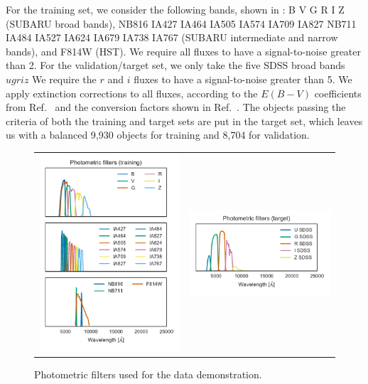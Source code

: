 \documentclass[aps,prd,showpacs,superscriptaddress,groupedaddress]{revtex4}  %
\begin{document}
For the training set, we consider the following bands, shown in : B V G R I Z (SUBARU broad bands), NB816 IA427 IA464 IA505 IA574 IA709 IA827 NB711 IA484 IA527 IA624 IA679 IA738 IA767  (SUBARU intermediate and narrow bands), and F814W (HST). 
We require all fluxes to have a signal-to-noise greater than 2. 
For the validation/target set, we only take the five SDSS broad bands $ugriz$
We require the $r$ and $i$ fluxes to have a signal-to-noise greater than 5.
We apply extinction corrections to all fluxes, according to the $E(B-V)$ coefficients from Ref.~\citep{Schlegel:1998} and the conversion factors shown in Ref.~\citep{Andrews:2016}.
The objects passing the criteria of both the training and target sets are put in the target set, which leaves us with a balanced 9,930 objects for training and 8,704 for validation.

\begin{figure}
\centering\begin{tabular}{cc}
\begin{minipage}{8cm}\includegraphics[width=8cm]{filters_training.pdf}\end{minipage}&
\begin{minipage}{8cm}\includegraphics[width=8cm]{filters_target.pdf}\end{minipage}
\end{tabular}
\caption{Photometric filters used for the data demonstration.}
\label{fig:filters}
\end{figure}
\end{document}

